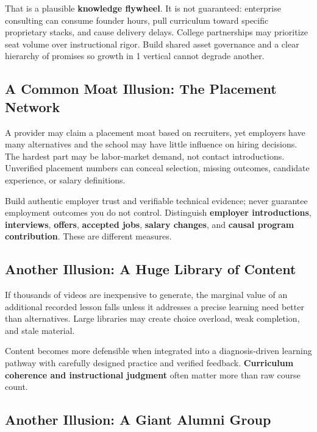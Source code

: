 That is a plausible \textbf{knowledge flywheel}. It is not guaranteed: enterprise consulting can consume founder hours, pull curriculum toward specific proprietary stacks, and cause delivery delays. College partnerships may prioritize seat volume over instructional rigor. Build shared asset governance and a clear hierarchy of promises so growth in 1 vertical cannot degrade another.

\subsection{A Common Moat Illusion: The Placement Network}
\label{sec:common_illusion_placement_network}

A provider may claim a placement moat based on recruiters, yet employers have many alternatives and the school may have little influence on hiring decisions. The hardest part may be labor-market demand, not contact introductions. Unverified placement numbers can conceal selection, missing outcomes, candidate experience, or salary definitions.

Build authentic employer trust and verifiable technical evidence; never guarantee employment outcomes you do not control. Distinguish \textbf{employer introductions}, \textbf{interviews}, \textbf{offers}, \textbf{accepted jobs}, \textbf{salary changes}, and \textbf{causal program contribution}. These are different measures.

\subsection{Another Illusion: A Huge Library of Content}
\label{sec:illusion_huge_content_library}

If thousands of videos are inexpensive to generate, the marginal value of an additional recorded lesson falls unless it addresses a precise learning need better than alternatives. Large libraries may create choice overload, weak completion, and stale material.

Content becomes more defensible when integrated into a diagnosis-driven learning pathway with carefully designed practice and verified feedback. \textbf{Curriculum coherence and instructional judgment} often matter more than raw course count.

\subsection{Another Illusion: A Giant Alumni Group}
\label{sec:illusion_giant_alumni_group}

